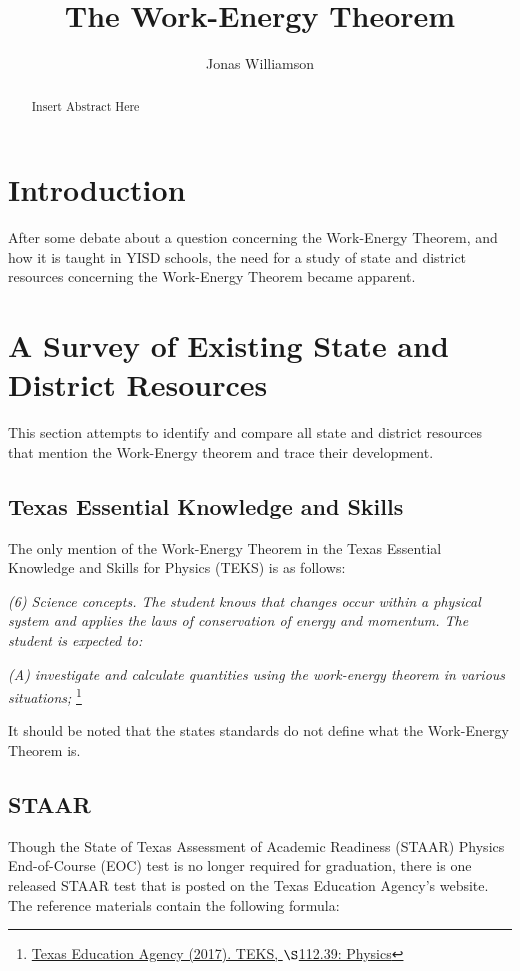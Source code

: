 \documentclass[letterpaper, 12pt]{article}
\begin{document}
	\title{The Work-Energy Theorem}
	\author{Jonas Williamson}

\maketitle

\begin{abstract}
	Insert Abstract Here
\end{abstract}
	





\section{Introduction}

After some debate about a question concerning the Work-Energy Theorem, and how it is taught in YISD schools, the need for a study of state and district resources concerning the Work-Energy Theorem became apparent.  

\section{A Survey of Existing State and District Resources}
This section attempts to identify and compare all state and district resources that mention the Work-Energy theorem and trace their development.  

\subsection{Texas Essential Knowledge and Skills}
  The only mention of the Work-Energy Theorem in the Texas Essential Knowledge and Skills for Physics (TEKS) is as follows:
\begin{displayquote}
\textit{(6) Science concepts. The student knows that changes occur within a physical system and applies the laws of conservation of energy and momentum. The student is expected to:}

\textit{(A) investigate and calculate quantities using the work-energy theorem in various situations;} \footnote{\color{blue}\href{http://ritter.tea.state.tx.us/rules/tac/chapter112/ch112c.html}{Texas Education Agency (2017). TEKS, $\S$112.39: Physics}\color{black}} 
\end{displayquote}

It should be noted that the states standards do not define what the Work-Energy Theorem is.  

\subsection{STAAR}\label{STAAR}
Though the State of Texas Assessment of Academic Readiness (STAAR) Physics End-of-Course (EOC) test is no longer required for graduation, there is one released STAAR test that is posted on the Texas Education Agency's website. The reference materials contain the following formula:
\end{document}
